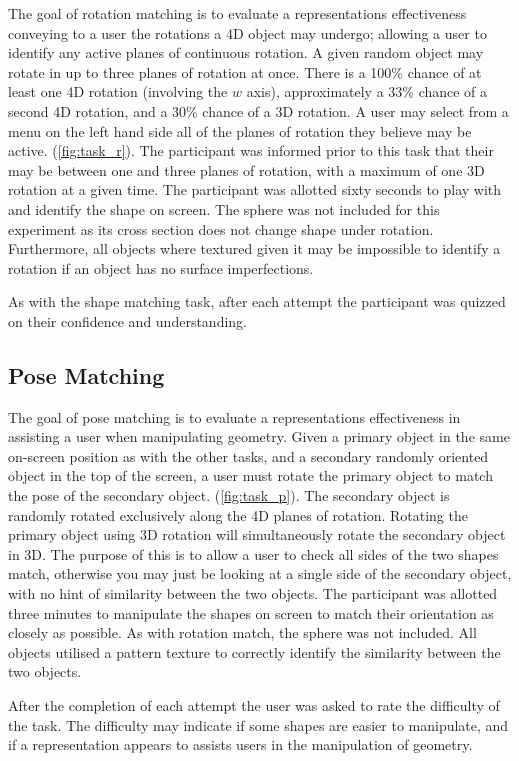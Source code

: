 \documentclass{l4proj}
\begin{document}
The goal of rotation matching is to evaluate a representations effectiveness conveying to a user the rotations a 4D object may undergo; allowing a user to identify any active planes of continuous rotation.
A given random object may rotate in up to three planes of rotation at once. There is a 100\% chance of at least one 4D rotation (involving the \(w\) axis), approximately a 33\% chance of a second 4D rotation, and a 30\% chance of a 3D rotation.
A user may select from a menu on the left hand side all of the planes of rotation they believe may be active. (\cref{fig:task_r}).
The participant was informed prior to this task that their may be between one and three planes of rotation, with a maximum of one 3D rotation at a given time.
The participant was allotted sixty seconds to play with and identify the shape on screen.
The sphere was not included for this experiment as its cross section does not change shape under rotation. 
Furthermore, all objects where textured given it may be impossible to identify a rotation if an object has no surface imperfections.

As with the shape matching task, after each attempt the participant was quizzed on their confidence and understanding.

\subsection{Pose Matching}

The goal of pose matching is to evaluate a representations effectiveness in assisting a user when manipulating geometry.
Given a primary object in the same on-screen position as with the other tasks, and a secondary randomly oriented object in the top of the screen, a user must rotate the primary object to match the pose of the secondary object. (\cref{fig:task_p}).
The secondary object is randomly rotated exclusively along the 4D planes of rotation. 
Rotating the primary object using 3D rotation will simultaneously rotate the secondary object in 3D. The purpose of this is to allow a user to check all sides of the two shapes match, otherwise you may just be looking at a single side of the secondary object, with no hint of similarity between the two objects.
The participant was allotted three minutes to manipulate the shapes on screen to match their orientation as closely as possible.
As with rotation match, the sphere was not included. All objects utilised a pattern texture to correctly identify the similarity between the two objects.

After the completion of each attempt the user was asked to rate the difficulty of the task. The difficulty may indicate if some shapes are easier to manipulate, and if a representation appears to assists users in the manipulation of geometry.
\end{document}

